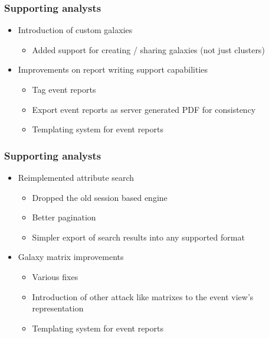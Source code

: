 \begin{frame}
  \frametitle{Supporting analysts}
  \begin{itemize}
       \item Introduction of custom galaxies
       \begin{itemize}
           \item Added support for creating / sharing galaxies (not just clusters)
       \end{itemize}
       \item Improvements on report writing support capabilities
       \begin{itemize}
           \item Tag event reports
           \item Export event reports as server generated PDF for consistency
           \item Templating system for event reports
       \end{itemize}
  \end{itemize}
\end{frame}

\begin{frame}
  \frametitle{Supporting analysts}
  \begin{itemize}
       \item Reimplemented attribute search
       \begin{itemize}
           \item Dropped the old session based engine
           \item Better pagination
           \item Simpler export of search results into any supported format
       \end{itemize}
       \item Galaxy matrix improvements
       \begin{itemize}
           \item Various fixes
           \item Introduction of other attack like matrixes to the event view's representation
           \item Templating system for event reports
       \end{itemize}
  \end{itemize}
\end{frame}

